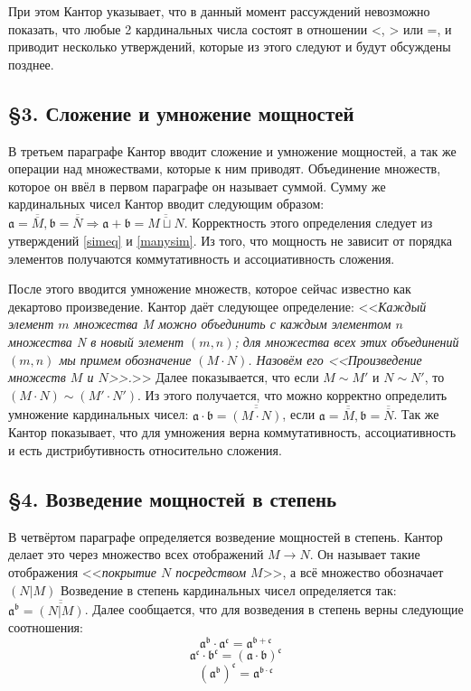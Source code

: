 \documentclass[a4paper,12pt]{extarticle}
\theoremstyle{definition}
\newcommand{\cit}[1]{<<\textit{#1}>>}
\newcommand{\car}[1]{\overline{\overline{#1}}}
\begin{document}
При этом Кантор указывает, что в данный момент рассуждений невозможно показать, что любые 2 кардинальных числа состоят в отношении <, > или =,
и приводит несколько утверждений, которые из этого следуют и будут обсуждены позднее.

\subsection{\S 3. Сложение и умножение мощностей}
В третьем параграфе Кантор вводит сложение и умножение мощностей, а так же операции над множествами, которые к ним приводят.
Объединение множеств, которое он ввёл в первом параграфе он называет суммой.
Сумму же кардинальных чисел Кантор вводит следующим образом: $\mathfrak{a} = \car{M}, \mathfrak{b} = \car{N} \Rightarrow \mathfrak{a + b} = \car{M \sqcup N}$.
Корректность этого определения следует из утверждений \ref{simeq} и \ref{manysim}.
Из того, что мощность не зависит от порядка элементов получаются коммутативность и ассоциативность сложения.

После этого вводится умножение множеств, которое сейчас известно как декартово произведение.
Кантор даёт следующее определение: \cit{Каждый элемент $m$ множества M можно объединить с каждым элементом $n$ множества N в новый элемент $(m, n)$;
для множества всех этих объединений $(m, n)$ мы примем обозначение $(M \cdot N)$. Назовём его <<\textnormal{Произведение множеств $M$ и $N$}>>.}
Далее показывается, что если $M \sim M'$ и $N \sim N'$, то $(M \cdot N) \sim (M' \cdot N')$.
Из этого получается, что можно корректно определить умножение кардинальных чисел: $\mathfrak{a \cdot b} = \car{(M \cdot N)}$, если $\mathfrak{a} = \car{M}, \mathfrak{b} = \car{N}$.
Так же Кантор показывает, что для умножения верна коммутативность, ассоциативность и есть дистрибутивность относительно сложения.

\subsection{\S 4. Возведение мощностей в степень}
В четвёртом параграфе определяется возведение мощностей в степень.
Кантор делает это через множество всех отображений $M \rightarrow N$.
Он называет такие отображения \cit{покрытие $N$ посредством $M$}, а всё множество обозначает $(N|M)$
Возведение в степень кардинальных чисел определяется так: $\mathfrak{a^b} = \car{(N|M)}$.
Далее сообщается, что для возведения в степень верны следующие соотношения:
$$\mathfrak{a^b \cdot a^c = a^{b+c}}$$
$$\mathfrak{a^c \cdot b^c = (a \cdot b)^c}$$
$$\mathfrak{(a^b)^c = a^{b \cdot c}}$$
\end{document}
